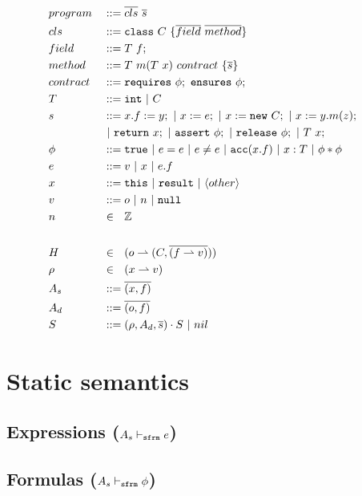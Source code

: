 \documentclass[11pt,a4paper]{article}
\begin{document}
\begin{align*}
\\ &program    	&&::= \overline{cls}~\overline{s}
\\ &cls    		&&::= \texttt{class}~ C~\{\overline{field}~\overline{method}\}
\\ &field    	&&::= T~f;
\\ &method		&&::= T~m(T~x)~contract~\{\overline{s}\}
\\ &contract	&&::= \texttt{requires}~ \phi;~\texttt{ensures}~ \phi;
\\ &T			&&::= \texttt{int} ~|~ C
\\ &s			&&::= x.f := y;
				  ~|~ x := e; 
				  ~|~ x := \texttt{new}~ C; 
				  ~|~ x := y.m(z);
\\ & &&
				  ~|~ \texttt{return}~ x; 
				  ~|~ \texttt{assert}~ \phi; 
				  ~|~ \texttt{release}~ \phi;
				  ~|~ T~x;
\\ &\phi		&&::= \texttt{true}
				  ~|~ e = e
				  ~|~ e \neq e
				  ~|~ \texttt{acc}(x.f)
				  ~|~ x : T
				  ~|~ \phi * \phi
\\ &e			&&::= v
				  ~|~ x
				  ~|~ e.f
\\ &x			&&::= \texttt{this} ~|~ \texttt{result} ~|~ \langle other \rangle
\\ &v			&&::= o ~|~ n ~|~ \texttt{null}
\\ &n			&&\in~~ \mathbb{Z}
\\				  
\\ &H			&&\in~~ (o \rightharpoonup (C,\overline{(f \rightharpoonup v)}))
\\ &\rho		&&\in~~ (x \rightharpoonup v)
\\ &A_s			&&::= \overline{(x, f)}
\\ &A_d			&&::= \overline{(o, f)}
\\ &S			&&::= (\rho, A_d, \overline{s}) \cdot S ~|~ nil
\end{align*}

\section{Static semantics}
\subsection{Expressions ($A_s \vdash_\texttt{sfrm} e$)}


\subsection{Formulas ($A_s \vdash_\texttt{sfrm} \phi$)}

\end{document}
